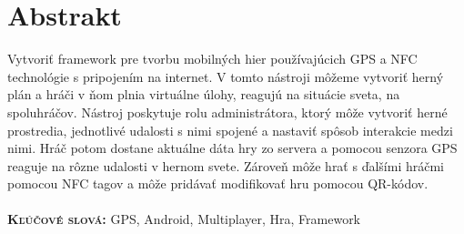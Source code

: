 \chapter{Abstrakt}
Vytvoriť framework pre tvorbu mobilných hier používajúcich GPS a NFC technológie s pripojením na internet. V tomto nástroji môžeme vytvoriť herný plán a hráči v ňom plnia virtuálne úlohy, reagujú na situácie sveta, na spoluhráčov. Nástroj poskytuje rolu administrátora, ktorý môže vytvoriť herné prostredia, jednotlivé udalosti s nimi spojené a nastaviť spôsob interakcie medzi nimi. Hráč potom dostane aktuálne dáta hry zo servera a pomocou senzora GPS reaguje na rôzne udalosti v hernom svete. Zároveň môže hrať s ďalšími hráčmi pomocou NFC tagov a môže pridávať modifikovať hru pomocou QR-kódov.\\ \\
\textbf{\textsc{Kľúčové slová:}} GPS, Android, Multiplayer, Hra, Framework

